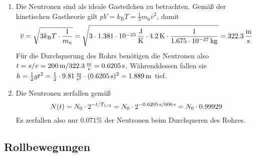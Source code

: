 \documentclass[a4paper]{scrartcl}
\begin{document}
\begin{enumerate}[noitemsep]
  \item Die Neutronen sind als ideale Gasteilchen zu betrachten. Gemäß der kinetischen Gastheorie gilt $pV = k_\text{B}T = \frac{1}{3}m_\text{n}\overline v^2$, damit
\begin{equation*}
  \overline v = \sqrt{3 k_\text{B} T \cdot \frac{1}{m_\text{n}}} = \sqrt{3 \cdot \unit[1.381 \cdot 10^{-23}]{\frac{J}{K}} \cdot \unit[4.2]{K} \cdot \frac{1}{\unit[1.675 \cdot 10^{-27}]{kg}}} = \unit[322.3]{\frac{m}{s}}
\end{equation*}
Für die Durchquerung des Rohrs benötigen die Neutronen also $t = s/v = \unit[200]{m} / \unit[322.3]{\frac{m}{s}} = \unit[0.6205]{s}$. Währenddessen fallen sie $h = \frac{1}{2}gt^2 = \frac{1}{2} \cdot \unit[9.81]{\frac{m}{s^2}} \cdot (\unit[0.6205]{s})^2 = \unit[1.889]{m}$ tief.

\item Die Neutronen zerfallen gemäß
  \begin{equation*}
    N(t) = N_0 \cdot 2^{-t/T_{1/2}} = N_0 \cdot 2^{-\unit[0.6205]{s}/\unit[606]{s}} = N_0 \cdot 0.99929
  \end{equation*}
  Es zerfallen also nur $0.071\%$ der Neutronen beim Durchqueren des Rohres.
\end{enumerate}

  
\subsection{Rollbewegungen} 
\end{document}

